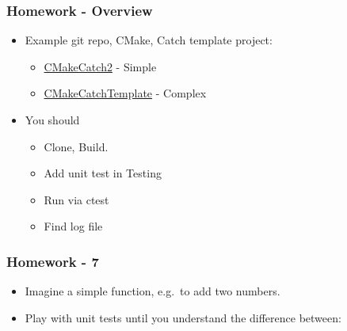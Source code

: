 \subsubsection{Homework - Overview}\label{homework---overview}

\begin{itemize}
\itemsep1pt\parskip0pt
\item
  Example git repo, CMake, Catch template project:

  \begin{itemize}
  \itemsep1pt\parskip0pt
  \item
    \href{https://github.com/MattClarkson/CMakeCatch2}{CMakeCatch2} -
    Simple
  \item
    \href{https://github.com/MattClarkson/CMakeCatchTemplate}{CMakeCatchTemplate}
    - Complex
  \end{itemize}
\item
  You should

  \begin{itemize}
  \itemsep1pt\parskip0pt
  \item
    Clone, Build.
  \item
    Add unit test in Testing
  \item
    Run via ctest
  \item
    Find log file
  \end{itemize}
\end{itemize}

\subsubsection{Homework - 7}\label{homework---7}

\begin{itemize}
\itemsep1pt\parskip0pt
\item
  Imagine a simple function, e.g.~to add two numbers.
\item
  Play with unit tests until you understand the difference between:
\end{itemize}

\begin{Shaded}
\begin{Highlighting}[]
   
   
 
  \NormalTok{* }  \NormalTok{* } 
\end{Highlighting}
\end{Shaded}

